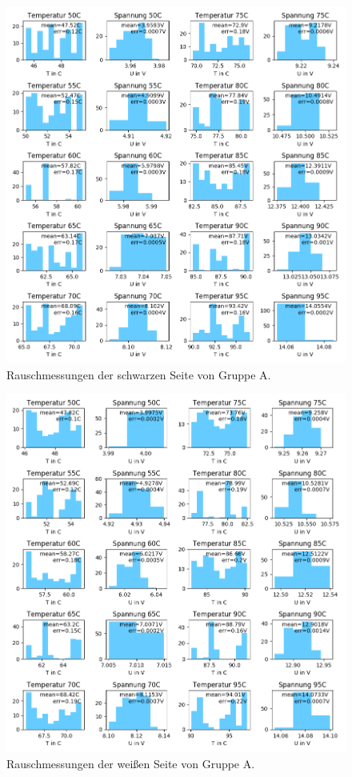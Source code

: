 \documentclass[12pt,a4paper]{article}
\begin{document}
\begin{figure}[H]
\includegraphics[scale=0.8]{Bilder/Rauschen_A_schwarz_2.png}
\caption{Rauschmessungen der schwarzen Seite von Gruppe A.}
\end{figure}

\begin{figure}[H]
\includegraphics[scale=0.8]{Bilder/Rauschen_A_weiss_2.png}
\caption{Rauschmessungen der weißen Seite von Gruppe A.}
\end{figure}
\end{document}
